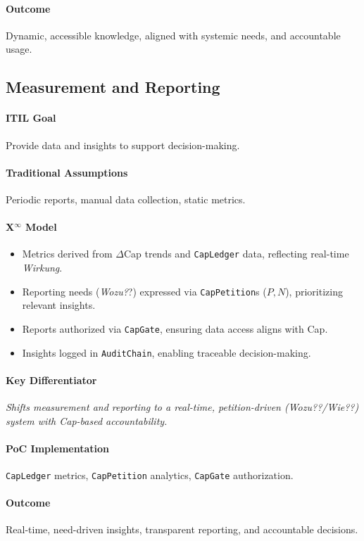 \documentclass[12pt, a4paper]{scrartcl}
\newcommand{\Xinf}{X$^\infty$}                        %
\newcommand{\DeltaCap}{$\Delta$Cap}                    %
\newcommand{\CapLedger}{\texttt{CapLedger}}          %
\newcommand{\Wirkung}{\textit{Wirkung}}                 %
\newcommand{\CapGate}{\texttt{CapGate}}
\newcommand{\AuditChain}{\texttt{AuditChain}}
\newcommand{\CapPetition}{\texttt{CapPetition}}        %
\newcommand{\Wozu}{\textit{Wozu?}}                      %
\newcommand{\Wie}{\textit{Wie?}}                        %
\begin{document}
\paragraph{Outcome} Dynamic, accessible knowledge, aligned with systemic needs, and accountable usage.

\subsection{Measurement and Reporting} %
\paragraph{ITIL Goal} Provide data and insights to support decision-making.
\paragraph{Traditional Assumptions} Periodic reports, manual data collection, static metrics.
\paragraph*{\Xinf{} Model}
\begin{itemize}
    \item Metrics derived from \DeltaCap{} trends and \CapLedger{} data, reflecting real-time \Wirkung{}.
    \item Reporting needs (\Wozu?) expressed via \CapPetition{}s ($P, N$), prioritizing relevant insights.
    \item Reports authorized via \CapGate{}, ensuring data access aligns with Cap.
    \item Insights logged in \AuditChain{}, enabling traceable decision-making.
\end{itemize}
\paragraph{Key Differentiator} \textit{Shifts measurement and reporting to a real-time, petition-driven (\Wozu?/\Wie?) system with Cap-based accountability.}
\paragraph{PoC Implementation} \CapLedger{} metrics, \CapPetition{} analytics, \CapGate{} authorization.
\paragraph{Outcome} Real-time, need-driven insights, transparent reporting, and accountable decisions.
\end{document}

